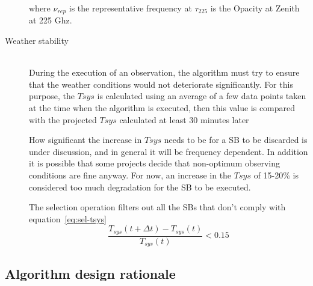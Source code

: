 \begin{description}
where $\nu_{rep}$ is the representative frequency at $\tau_{225}$ is the Opacity
at Zenith at 225 Ghz.

\item[Weather stability] \hfill \\
During the execution of an observation, the algorithm must try to ensure that the weather conditions would not deteriorate significantly.
For this purpose, the $Tsys$ is calculated using an average of a few data
points taken at the time when the algorithm is executed, then this value is compared with the
projected $Tsys$ calculated at least 30 minutes later

How significant the increase in $Tsys$ needs to be for a SB to be discarded
is under discussion, and in general it will be frequency dependent. In addition
it is possible that some projects decide that non-optimum observing conditions are
fine anyway. For now, an increase in the $Tsys$  of 15-20\% is considered too much
degradation for the SB to be executed.

The selection operation filters out all the SBs that don't comply with equation~\ref{eq:sel-tsys}
\begin{equation}
\label{eq:sel-tsys}
\frac{T_{sys}(t+\Delta t) - T_{sys}(t)}{T_{sys}(t)} < 0.15
\end{equation}

\end{description}

\subsection{Algorithm design rationale}

